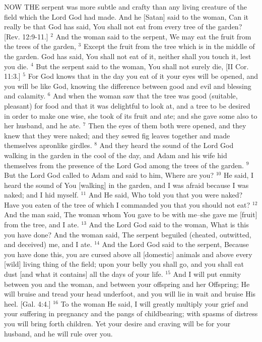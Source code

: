 NOW THE serpent was more subtle and crafty than any living creature of the field which the Lord God had made. And he [Satan] said to the woman, Can it really be that God has said, You shall not eat from every tree of the garden? [Rev. 12:9-11.]
$^{2}$ And the woman said to the serpent, We may eat the fruit from the trees of the garden,
$^{3}$ Except the fruit from the tree which is in the middle of the garden. God has said, You shall not eat of it, neither shall you touch it, lest you die.
$^{4}$ But the serpent said to the woman, You shall not surely die, [II Cor. 11:3.]
$^{5}$ For God knows that in the day you eat of it your eyes will be opened, and you will be like God, knowing the difference between good and evil and blessing and calamity.
$^{6}$ And when the woman saw that the tree was good (suitable, pleasant) for food and that it was delightful to look at, and a tree to be desired in order to make one wise, she took of its fruit and ate; and she gave some also to her husband, and he ate.
$^{7}$ Then the eyes of them both were opened, and they knew that they were naked; and they sewed fig leaves together and made themselves apronlike girdles.
$^{8}$ And they heard the sound of the Lord God walking in the garden in the cool of the day, and Adam and his wife hid themselves from the presence of the Lord God among the trees of the garden.
$^{9}$ But the Lord God called to Adam and said to him, Where are you?
$^{10}$ He said, I heard the sound of You [walking] in the garden, and I was afraid because I was naked; and I hid myself.
$^{11}$ And He said, Who told you that you were naked? Have you eaten of the tree of which I commanded you that you should not eat?
$^{12}$ And the man said, The woman whom You gave to be with me–she gave me [fruit] from the tree, and I ate.
$^{13}$ And the Lord God said to the woman, What is this you have done? And the woman said, The serpent beguiled (cheated, outwitted, and deceived) me, and I ate.
$^{14}$ And the Lord God said to the serpent, Because you have done this, you are cursed above all [domestic] animals and above every [wild] living thing of the field; upon your belly you shall go, and you shall eat dust [and what it contains] all the days of your life.
$^{15}$ And I will put enmity between you and the woman, and between your offspring and her Offspring; He will bruise and tread your head underfoot, and you will lie in wait and bruise His heel. [Gal. 4:4.]
$^{16}$ To the woman He said, I will greatly multiply your grief and your suffering in pregnancy and the pangs of childbearing; with spasms of distress you will bring forth children. Yet your desire and craving will be for your husband, and he will rule over you.
